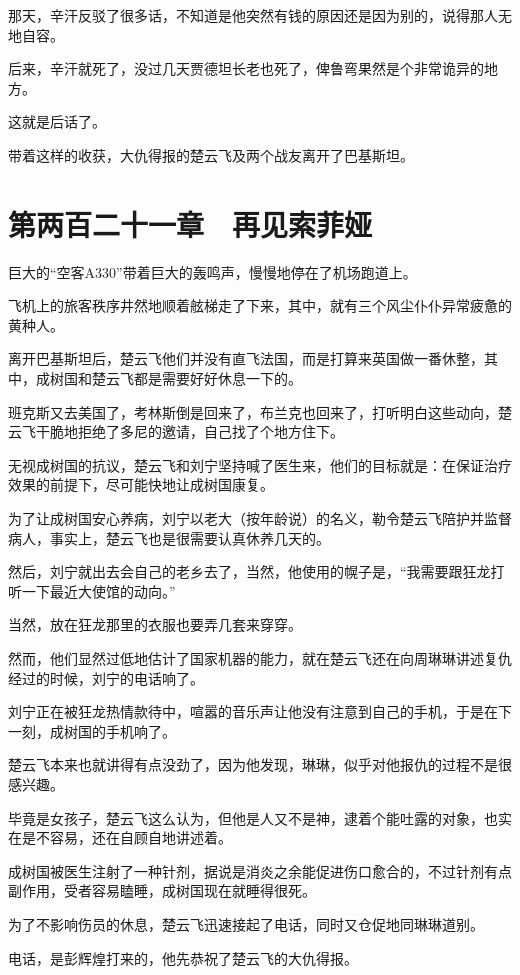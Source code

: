 那天，辛汗反驳了很多话，不知道是他突然有钱的原因还是因为别的，说得那人无地自容。

后来，辛汗就死了，没过几天贾德坦长老也死了，俾鲁弯果然是个非常诡异的地方。

这就是后话了。

带着这样的收获，大仇得报的楚云飞及两个战友离开了巴基斯坦。

\section{第两百二十一章　再见索菲娅}

巨大的“空客A330”带着巨大的轰鸣声，慢慢地停在了机场跑道上。

飞机上的旅客秩序井然地顺着舷梯走了下来，其中，就有三个风尘仆仆异常疲惫的黄种人。

离开巴基斯坦后，楚云飞他们并没有直飞法国，而是打算来英国做一番休整，其中，成树国和楚云飞都是需要好好休息一下的。

班克斯又去美国了，考林斯倒是回来了，布兰克也回来了，打听明白这些动向，楚云飞干脆地拒绝了多尼的邀请，自己找了个地方住下。

无视成树国的抗议，楚云飞和刘宁坚持喊了医生来，他们的目标就是：在保证治疗效果的前提下，尽可能快地让成树国康复。

为了让成树国安心养病，刘宁以老大（按年龄说）的名义，勒令楚云飞陪护并监督病人，事实上，楚云飞也是很需要认真休养几天的。

然后，刘宁就出去会自己的老乡去了，当然，他使用的幌子是，“我需要跟狂龙打听一下最近大使馆的动向。”

当然，放在狂龙那里的衣服也要弄几套来穿穿。

然而，他们显然过低地估计了国家机器的能力，就在楚云飞还在向周琳琳讲述复仇经过的时候，刘宁的电话响了。

刘宁正在被狂龙热情款待中，喧嚣的音乐声让他没有注意到自己的手机，于是在下一刻，成树国的手机响了。

楚云飞本来也就讲得有点没劲了，因为他发现，琳琳，似乎对他报仇的过程不是很感兴趣。

毕竟是女孩子，楚云飞这么认为，但他是人又不是神，逮着个能吐露的对象，也实在是不容易，还在自顾自地讲述着。

成树国被医生注射了一种针剂，据说是消炎之余能促进伤口愈合的，不过针剂有点副作用，受者容易瞌睡，成树国现在就睡得很死。

为了不影响伤员的休息，楚云飞迅速接起了电话，同时又仓促地同琳琳道别。

电话，是彭辉煌打来的，他先恭祝了楚云飞的大仇得报。

